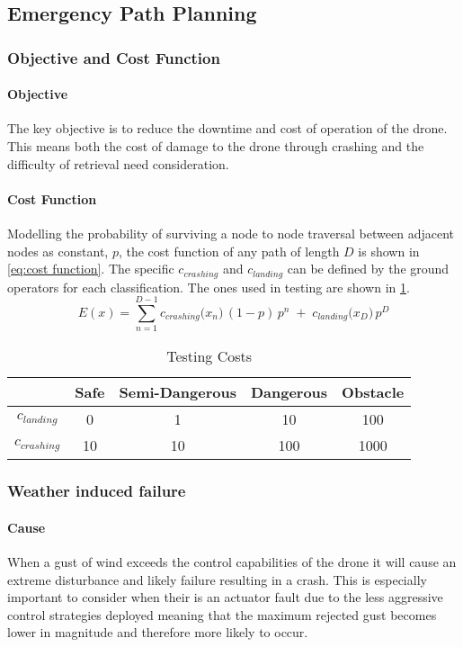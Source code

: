 \subsection{Emergency Path Planning}

\subsubsection{Objective and Cost Function}
\paragraph{Objective}
The key objective is to reduce the downtime and cost of operation of the drone. This means both the cost of damage to the drone through crashing and the difficulty of retrieval need consideration.
\paragraph{Cost Function}
Modelling the probability of surviving a node to node traversal between adjacent nodes as constant, $p$, the cost function of any path of length $D$ is shown in \ref{eq:cost function}. The specific $c_{crashing}$ and $c_{landing}$ can be defined by the ground operators for each classification. The ones used in testing are shown in \ref{tab:cost_values}.
\begin{equation}\label{eq:cost function}
    E(x) 
    = \sum_{n=1}^{D-1} c_{crashing}\bigl(x_n\bigr)\, (1-p) \,p^n 
    \;+\; c_{landing}\bigl(x_D\bigr)\, p^D
\end{equation}
\begin{table}[h]
    \centering
    \begin{tabular}{|c|c|c|c|c|}
    \hline
         \textbf{} & \textbf{Safe} & \textbf{Semi-Dangerous} & \textbf{Dangerous} & \textbf{Obstacle} \\
         \hline
         \textbf{$c_{landing}$} & 0 & 1 & 10 & 100 \\
         \textbf{$c_{crashing}$} & 10 & 10 & 100 & 1000\\
         \hline
    \end{tabular}
    \caption{Testing Costs}
    \label{tab:cost_values}
\end{table}

\subsubsection{Weather induced failure}
\paragraph{Cause}
When a gust of wind exceeds the control capabilities of the drone it will cause an extreme disturbance and likely failure resulting in a crash. This is especially important to consider when their is an actuator fault due to the less aggressive control strategies deployed meaning that the maximum rejected gust becomes lower in magnitude and therefore more likely to occur. 
